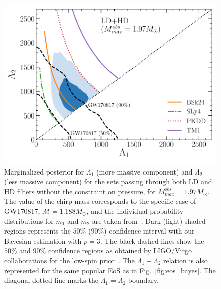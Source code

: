 \begin{figure}[!t]
\begin{center}
  \includegraphics[width=0.9\linewidth]{figures/tidal_bayes.pdf}
\end{center}
\caption[Posterior $\Lambda_1-\Lambda_2$ relation confronted with popular 
models and the GW170817 event]{Marginalized posterior for $\Lambda_1$ (more
massive component) and $\Lambda_2$ (less massive component) for
the sets passing through both LD and HD filters without the constraint on
pressure, for $M_{max}^{obs}=1.97M_\odot$. The value of the chirp mass 
corresponds to the specific case of GW170817, $\mathcal{M} = 1.188M_\odot$, and
the individual probability distributions for $m_1$ and $m_2$ are taken
from~\cite{GWtidal}. 
Dark (light) shaded regions represents the $50\%$ ($90\%$) confidence interval 
with our Bayesian estimation with $p=3$. The black dashed lines show the $50\%$ 
and $90\%$ confidence regions as obtained by LIGO/Virgo collaborations for the 
low-spin prior~\cite{GW1}. The $\Lambda_1-\Lambda_2$ relation is also
represented for the same popular EoS as in Fig.~\ref{fig:eos_bayes}. The 
diagonal dotted line marks the $\Lambda_1=\Lambda_2$ 
boundary.}\label{fig:tidal_bayes}
\end{figure}

